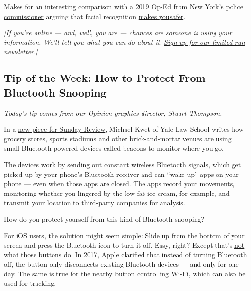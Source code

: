 Makes for an interesting comparison with a
\href{https://www.nytimes.com/2019/06/09/opinion/facial-recognition-police-new-york-city.html?action=click\&module=privacy\%20footer\%20recirc\%20module\&pgtype=Article}{2019
Op-Ed from New York's police commissioner} arguing that facial
recognition
\href{https://www.nytimes.com/interactive/2019/04/16/opinion/facial-recognition-new-york-city.html}{makes
you}\href{https://www.nytimes.com/interactive/2019/04/16/opinion/facial-recognition-new-york-city.html}{safer}.

\emph{{[}If you're online --- and, well, you are --- chances are someone
is using your information. We'll tell you what you can do about it.}
\href{https://www.nytimes.com/newsletters/privacy-project?action=click\&module=Intentional\&pgtype=Article}{\emph{Sign
up for our limited-run newsletter}}\emph{.{]}}

\hypertarget{tip-of-the-week-how-to-protect-from-bluetooth-snooping}{%
\subsection{Tip of the Week: How to Protect From Bluetooth
Snooping}\label{tip-of-the-week-how-to-protect-from-bluetooth-snooping}}

\emph{Today's tip comes from our Opinion graphics director, Stuart
Thompson.}

In a
\href{https://www.nytimes.com/interactive/2019/06/14/opinion/bluetooth-wireless-tracking-privacy.html}{new
piece for Sunday Review}, Michael Kwet of Yale Law School writes how
grocery stores, sports stadiums and other brick-and-mortar venues are
using small Bluetooth-powered devices called beacons to monitor where
you go.

The devices work by sending out constant wireless Bluetooth signals,
which get picked up by your phone's Bluetooth receiver and can ``wake
up'' apps on your phone --- even when those
\href{https://docs.gimbal.com/proximity_overview.html\#wakeup_app}{apps
are closed}. The apps record your movements, monitoring whether you
lingered by the low-fat ice cream, for example, and transmit your
location to third-party companies for analysis.

How do you protect yourself from this kind of Bluetooth snooping?

For iOS users, the solution might seem simple: Slide up from the bottom
of your screen and press the Bluetooth icon to turn it off. Easy, right?
Except that's
\href{https://www.theverge.com/2018/2/25/17041440/bluetooth-location-tracking-iphone-android-privacy}{not
what those buttons do}. In
\href{https://arstechnica.com/gadgets/2017/11/apple-clarifies-what-control-center-wi-fi-bluetooth-toggles-do-in-ios-11-2-beta/}{2017},
Apple clarified that instead of turning Bluetooth off, the button only
disconnects existing Bluetooth devices --- and only for one day. The
same is true for the nearby button controlling Wi-Fi, which can also be
used for tracking.

